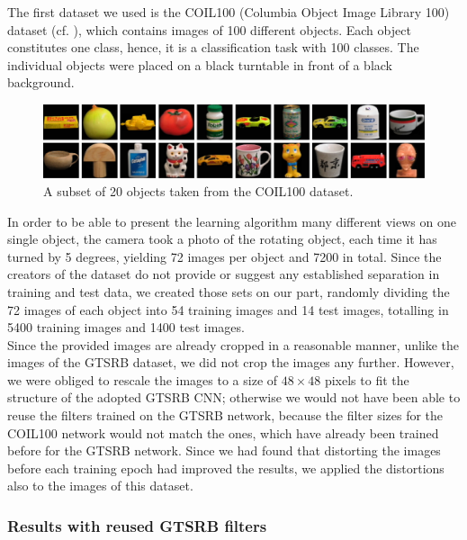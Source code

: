 \documentclass[11pt, a4paper]{article}
\begin{document}
The first dataset we used is the COIL100 (Columbia Object Image Library 100) dataset (cf. \cite{columbia_object_image_library}), which contains images of 100 different objects. Each object constitutes one class, hence, it is a classification task with 100 classes. The individual objects were placed on a black turntable in front of a black background. 
\begin{figure}[h!]
	\centering
	\includegraphics[width=1\textwidth]{coil100}
	\caption{A subset of 20 objects taken from the COIL100 dataset.}
	\label{fig:coil100_objects}
\end{figure}
In order to be able to present the learning algorithm many different views on one single object, the camera took a photo of the rotating object, each time it has turned by 5 degrees, yielding 72 images per object and 7200 in total. Since the creators of the dataset do not provide or suggest any established separation in training and test data, we created those sets on our part, randomly dividing the 72 images of each object into 54 training images and 14 test images, totalling in 5400 training images and 1400 test images.\\
Since the provided images are already cropped in a reasonable manner, unlike the images of the GTSRB dataset, we did not crop the images any further. However, we were obliged to rescale the images to a size of $48 \times 48$ pixels to fit the structure of the adopted GTSRB CNN; otherwise we would not have been able to reuse the filters trained on the GTSRB network, because the filter sizes for the COIL100 network would not match the ones, which have already been trained before for the GTSRB network. Since we had found that distorting the images before each training epoch had improved the results, we applied the distortions also to the images of this dataset.

\subsubsection{Results with reused GTSRB filters}
\end{document}
